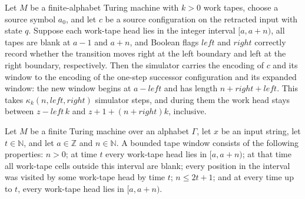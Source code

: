 \begin{lemma}
\label{Turing.FinTM.dg_step}
\leanok
{}
Let $M$ be a finite-alphabet Turing machine with $k>0$ work tapes, choose a source
symbol $a_0$, and let $c$ be a source configuration on the retracted input with state
$q$. Suppose each work-tape head lies in the integer interval $[a,a+n)$, all tapes are
blank at $a-1$ and $a+n$, and Boolean flags $\mathit{left}$ and $\mathit{right}$
correctly record whether the transition moves right at the left boundary and left at the
right boundary, respectively. Then the simulator carries the encoding of $c$ and its
window to the encoding of the one-step successor configuration and its expanded window:
the new window begins at $a-\mathit{left}$ and has length
$n+\mathit{right}+\mathit{left}$. This takes $\kappa_k(n,\mathit{left},\mathit{right})$
simulator steps, and during them the work head stays between $z-\mathit{left}\,k$ and
$z+1+(n+\mathit{right})k$, inclusive.
\end{lemma}

\begin{definition}
\label{Turing.FinTM.DGWindow}
\leanok
{}
Let $M$ be a finite Turing machine over an alphabet $\Gamma$, let $x$ be an input
string, let $t\in\mathbb{N}$, and let $a\in\mathbb{Z}$ and $n\in\mathbb{N}$. A bounded
tape window consists of the following properties: $n>0$; at time $t$ every work-tape
head lies in $[a,a+n)$; at that time all work-tape cells outside this interval are
blank; every position in the interval was visited by some work-tape head by time $t$;
$n\le 2t+1$; and at every time up to $t$, every work-tape head lies in $[a,a+n)$.
\end{definition}

